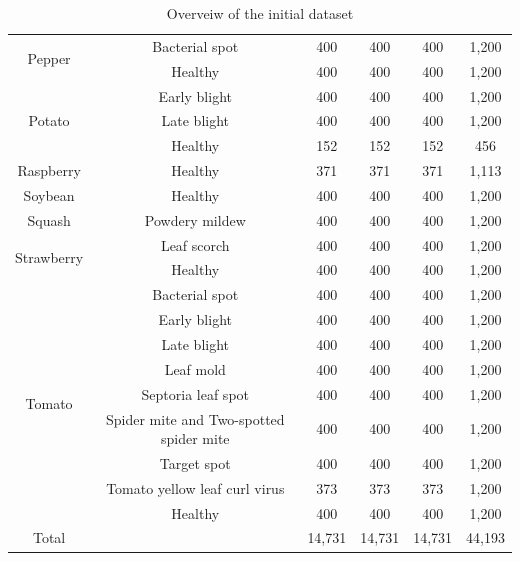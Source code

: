 \documentclass{BachelorBUI}
\begin{document}
\begin{table}[h]
\begin{tabular}{@{}c|c|c|c|c|c@{}}
                \multirow{2}{*}{Pepper} & Bacterial spot & 400 & 400 & 400 & 1,200 \\ \cline{2-6}
                & Healthy & 400 & 400 & 400 & 1,200 \\ \hline
                \multirow{3}{*}{Potato} & Early blight & 400 & 400 & 400 & 1,200 \\ \cline{2-6}
                & Late blight & 400 & 400 & 400 & 1,200 \\ \cline{2-6}
                & Healthy & 152 & 152 & 152 & 456 \\ \hline
                Raspberry & Healthy & 371 & 371 & 371 & 1,113 \\ \hline
                Soybean & Healthy & 400 & 400 & 400 & 1,200 \\ \hline
                Squash & Powdery mildew & 400 & 400 & 400 & 1,200 \\ \hline
                \multirow{2}{*}{Strawberry} & Leaf scorch & 400 & 400 & 400 & 1,200 \\ \cline{2-6}
                & Healthy & 400 & 400 & 400 & 1,200 \\ \hline
                \multirow{9}{*}{Tomato} & Bacterial spot & 400 & 400 & 400 & 1,200 \\ \cline{2-6}
                & Early blight & 400 & 400 & 400 & 1,200 \\ \cline{2-6}
                & Late blight & 400 & 400 & 400 & 1,200 \\ \cline{2-6}
                & Leaf mold & 400 & 400 & 400 & 1,200 \\ \cline{2-6}
                & Septoria leaf spot & 400 & 400 & 400 & 1,200 \\ \cline{2-6}
                & Spider mite and Two-spotted spider mite & 400 & 400 & 400 & 1,200 \\ \cline{2-6}
                & Target spot & 400 & 400 & 400 & 1,200 \\ \cline{2-6}
                & Tomato yellow leaf curl virus & 373 & 373 & 373 & 1,200 \\ \cline{2-6}
                & Healthy & 400 & 400 & 400 & 1,200 \\ \hline
                Total &  & 14,731 & 14,731 & 14,731 & 44,193 \\ \hline
            \end{tabular}
            \caption{\centering Overveiw of the initial dataset}
            \label{tab:dataset-overview}
        \end{table}
\end{document}
